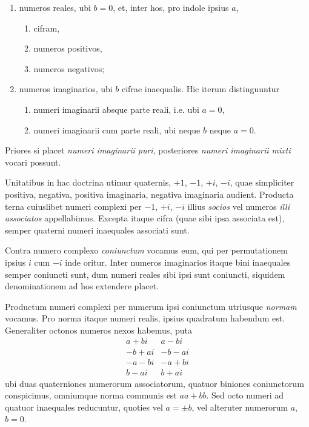 \documentclass[12pt]{article}
\begin{document}
\begin{enumerate}[label=\Roman*.]
\item numeros reales, ubi $b=0$, et, inter hos, pro indole ipsius $a$,
    \begin{enumerate}[label=\arabic*)]
    \item cifram,
    \item numeros positivos,
    \item numeros negativos;
    \end{enumerate}
\item numeros imaginarios, ubi $b$ cifrae inaequalis. Hic iterum distinguuntur
    \begin{enumerate}[label=\arabic*)]
    \item numeri imaginarii absque parte reali, i.e. ubi $a=0$,
    \item numeri imaginarii cum parte reali, ubi neque $b$ neque $a=0$.
    \end{enumerate}
\end{enumerate}

Priores si placet \textit{numeri imaginarii puri}, posteriores \textit{numeri imaginarii mixti} vocari possunt.

Unitatibus in hac doctrina utimur quaternis, $+1$, $-1$, $+i$, $-i$, quae simpliciter positiva, negativa, positiva imaginaria, negativa imaginaria audient. Producta terna cuiuslibet numeri complexi per $-1$, $+i$, $-i$ illius \textit{socios} vel numeros \textit{illi associatos} appellabimus. Excepta itaque cifra (quae sibi ipsa associata est), semper quaterni numeri inaequales associati sunt.

Contra numero complexo \textit{coniunctum} vocamus eum, qui per permutationem ipsius $i$ cum $-i$ inde oritur. Inter numeros imaginarios itaque bini inaequales semper coniuncti sunt, dum numeri reales sibi ipsi sunt coniuncti, siquidem denominationem ad hos extendere placet.

Productum numeri complexi per numerum ipsi coniunctum utriusque \textit{normam} vocamus. Pro norma itaque numeri realis, ipsius quadratum habendum est. Generaliter octonos numeros nexos habemus, puta
\[
\begin{array}{r|r}
 a+bi & a-bi\\
 -b+ai & -b-ai\\
 -a-bi & -a+bi\\
 b-ai & b+ai
\end{array}
\]
ubi duas quaterniones numerorum associatorum, quatuor biniones coniunctorum conspicimus, omniumque norma communis est $aa+bb$. Sed octo numeri ad quatuor inaequales reducuntur, quoties vel $a=\pm b$, vel alteruter numerorum $a$, $b=0$.
\end{document}
